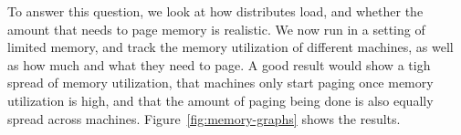 To answer this question, we look at how \sys{} distributes load, and whether the
amount that \sys{} needs to page memory is realistic. We now run \sys{} in a
setting of limited memory, and track the memory utilization of different
machines, as well as how much and what they need to page. A good result would
show a tigh spread of memory utilization, that machines only start paging once
memory utilization is high, and that the amount of paging being done is also
equally spread across machines. Figure~\ref{fig:memory-graphs} shows the
results.


